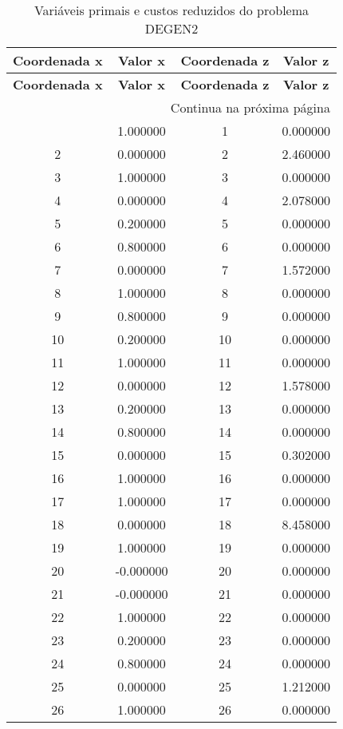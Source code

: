 \documentclass[12pt]{article}
\begin{document}
\begin{longtable}{@{}cccc@{}}
\caption{Variáveis primais e custos reduzidos do problema DEGEN2} \\
\toprule
\textbf{Coordenada x} & \textbf{Valor x} & \textbf{Coordenada z} & \textbf{Valor z} \\
\midrule
\endfirsthead

\toprule
\textbf{Coordenada x} & \textbf{Valor x} & \textbf{Coordenada z} & \textbf{Valor z} \\
\midrule
\endhead

\midrule \multicolumn{4}{r}{{Continua na próxima página}} \\ \midrule
\endfoot

\bottomrule
\endlastfoot
1 & 1.000000 & 1 & 0.000000 \\
2 & 0.000000 & 2 & 2.460000 \\
3 & 1.000000 & 3 & 0.000000 \\
4 & 0.000000 & 4 & 2.078000 \\
5 & 0.200000 & 5 & 0.000000 \\
6 & 0.800000 & 6 & 0.000000 \\
7 & 0.000000 & 7 & 1.572000 \\
8 & 1.000000 & 8 & 0.000000 \\
9 & 0.800000 & 9 & 0.000000 \\
10 & 0.200000 & 10 & 0.000000 \\
11 & 1.000000 & 11 & 0.000000 \\
12 & 0.000000 & 12 & 1.578000 \\
13 & 0.200000 & 13 & 0.000000 \\
14 & 0.800000 & 14 & 0.000000 \\
15 & 0.000000 & 15 & 0.302000 \\
16 & 1.000000 & 16 & 0.000000 \\
17 & 1.000000 & 17 & 0.000000 \\
18 & 0.000000 & 18 & 8.458000 \\
19 & 1.000000 & 19 & 0.000000 \\
20 & -0.000000 & 20 & 0.000000 \\
21 & -0.000000 & 21 & 0.000000 \\
22 & 1.000000 & 22 & 0.000000 \\
23 & 0.200000 & 23 & 0.000000 \\
24 & 0.800000 & 24 & 0.000000 \\
25 & 0.000000 & 25 & 1.212000 \\
26 & 1.000000 & 26 & 0.000000 \\

\end{longtable}
\end{document}

